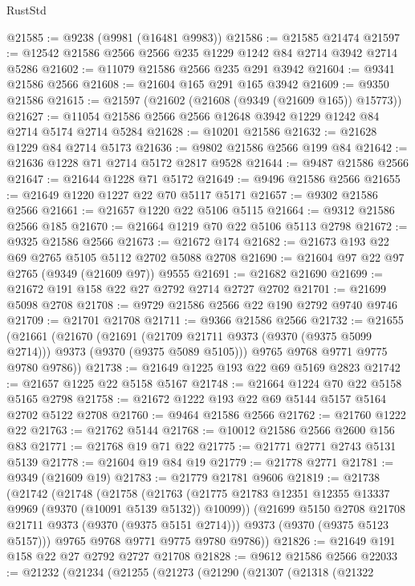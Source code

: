 \begin{lexlean}{RustStd}
\begin{coremodule}
{\begin{coremodule}
{{{{{{{{{{{{{{{{{{{{{{{{{{{{{{{{{{{{{{{@21585 := @9238 (@9981 (@16481 @9983))
@21586 := @21585 @21474
@21597 := @12542 @21586 @2566 @2566 @235 @1229 @1242 @84 @2714 @3942 @2714 @5286
@21602 := @11079 @21586 @2566 @235 @291 @3942
@21604 := @9341 @21586 @2566
@21608 := @21604 @165 @291 @165 @3942
@21609 := @9350 @21586
@21615 := @21597 (@21602 (@21608 (@9349 (@21609 @165)) @15773))
@21627 := @11054 @21586 @2566 @2566 @12648 @3942 @1229 @1242 @84 @2714 @5174 @2714 @5284
@21628 := @10201 @21586
@21632 := @21628 @1229 @84 @2714 @5173
@21636 := @9802 @21586 @2566 @199 @84
@21642 := @21636 @1228 @71 @2714 @5172 @2817 @9528
@21644 := @9487 @21586 @2566
@21647 := @21644 @1228 @71 @5172
@21649 := @9496 @21586 @2566
@21655 := @21649 @1220 @1227 @22 @70 @5117 @5171
@21657 := @9302 @21586 @2566
@21661 := @21657 @1220 @22 @5106 @5115
@21664 := @9312 @21586 @2566 @185
@21670 := @21664 @1219 @70 @22 @5106 @5113 @2798
@21672 := @9325 @21586 @2566
@21673 := @21672 @174
@21682 := @21673 @193 @22 @69 @2765 @5105 @5112 @2702 @5088 @2708
@21690 := @21604 @97 @22 @97 @2765 (@9349 (@21609 @97)) @9555
@21691 := @21682 @21690
@21699 := @21672 @191 @158 @22 @27 @2792 @2714 @2727 @2702
@21701 := @21699 @5098 @2708
@21708 := @9729 @21586 @2566 @22 @190 @2792 @9740 @9746
@21709 := @21701 @21708
@21711 := @9366 @21586 @2566
@21732 := @21655
    (@21661
      (@21670
        (@21691 (@21709 @21711 @9373 (@9370 (@9375 @5099 @2714))) @9373 (@9370 (@9375 @5089 @5105)))
        @9765
        @9768
        @9771
        @9775
        @9780
        @9786))
@21738 := @21649 @1225 @193 @22 @69 @5169 @2823
@21742 := @21657 @1225 @22 @5158 @5167
@21748 := @21664 @1224 @70 @22 @5158 @5165 @2798
@21758 := @21672 @1222 @193 @22 @69 @5144 @5157 @5164 @2702 @5122 @2708
@21760 := @9464 @21586 @2566
@21762 := @21760 @1222 @22
@21763 := @21762 @5144
@21768 := @10012 @21586 @2566 @2600 @156 @83
@21771 := @21768 @19 @71 @22
@21775 := @21771 @2771 @2743 @5131 @5139
@21778 := @21604 @19 @84 @19
@21779 := @21778 @2771
@21781 := @9349 (@21609 @19)
@21783 := @21779 @21781 @9606
@21819 := @21738
    (@21742
      (@21748
        (@21758
          (@21763 (@21775 @21783 @12351 @12355 @13337 @9969 (@9370 (@10091 @5139 @5132)) @10099))
          (@21699 @5150 @2708 @21708 @21711 @9373 (@9370 (@9375 @5151 @2714)))
          @9373
          (@9370 (@9375 @5123 @5157)))
        @9765
        @9768
        @9771
        @9775
        @9780
        @9786))
@21826 := @21649 @191 @158 @22 @27 @2792 @2727 @21708
@21828 := @9612 @21586 @2566
@22033 := @21232
    (@21234
      (@21255
        (@21273
          (@21290
            (@21307
              (@21318
                (@21322
}}}}}}}}}}}}}}}}}}}}}}}}}}}}}}}}}}}}}}}
\end{coremodule}}
\end{coremodule}
\end{lexlean}
